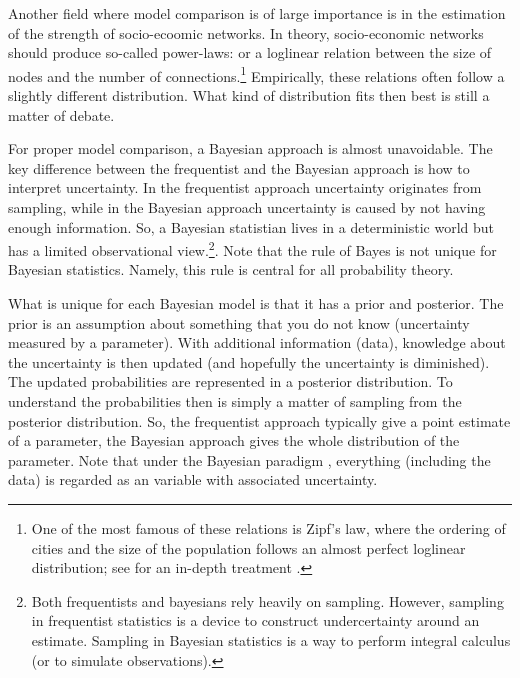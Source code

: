 \documentclass[fleqn,10pt]{SelfArx} %
\begin{document}
Another field where model comparison is of large importance is in the estimation
of the strength of socio-ecoomic networks. In theory, socio-economic networks
should produce so-called power-laws: or a loglinear relation between the size of
nodes and the number of connections.\footnote{One of the most famous of these
  relations is Zipf's law, where the ordering of cities and the size of the
  population follows an almost perfect loglinear distribution; see for an
  in-depth treatment \citet{gabaix1999zipf}.} Empirically, these relations often follow a
slightly different distribution. What kind of distribution fits then best is
still a matter of debate.  

For proper model comparison, a Bayesian approach is almost unavoidable. The key
difference between the frequentist and the Bayesian approach is how to interpret
uncertainty. In the frequentist approach uncertainty originates from sampling,
while in the Bayesian approach uncertainty is caused by not having enough
information. So, a Bayesian statistian lives in a deterministic world but has
a limited observational view.\footnote{Both frequentists and bayesians rely
  heavily on sampling. However, sampling in frequentist statistics is a device to construct undercertainty
around an estimate. Sampling in Bayesian statistics is a way to perform integral
calculus (or to simulate observations).}. Note that the rule of Bayes is not
unique for Bayesian statistics. Namely, this rule is central for all probability
theory.

What is unique for each Bayesian model is that it has a prior and posterior. The
prior is an assumption about something that you do not know (uncertainty
measured by a parameter). With additional information (data), knowledge about
the uncertainty is then updated (and hopefully the uncertainty is diminished).
The updated probabilities are represented in a posterior distribution. To
understand the probabilities then is simply a matter of sampling from the
posterior distribution. So, the
frequentist approach typically give a point estimate of a parameter, the Bayesian approach
gives the whole distribution of the parameter. Note that under the Bayesian
paradigm , everything (including the data) is regarded as an variable with
associated uncertainty.
\end{document}
